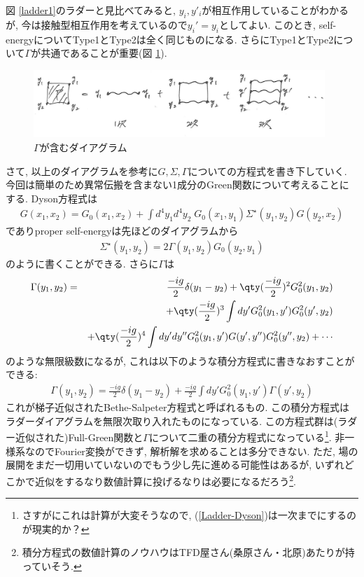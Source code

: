 \documentclass[10.5pt,a4paper]{jreport}
\begin{document}
図 \ref{ladder1}のラダーと見比べてみると, $y_i, y'_i$が相互作用していることがわかるが, 今は接触型相互作用を考えているので$y_i' = y_i$としてよい. このとき, self-energyについてType1とType2は全く同じものになる.  さらにType1とType2について$\Gamma$が共通であることが重要(図 \ref{ladder3}).
\begin{figure}[htbp]
  \begin{center}
    \includegraphics[width = 11cm]{./EPS/ladder3.eps}
  \end{center}
  \caption{$\Gamma$が含むダイアグラム}\label{ladder3}
\end{figure}
さて, 以上のダイアグラムを参考に$G, \Sigma, \Gamma$についての方程式を書き下していく. 今回は簡単のため異常伝搬を含まない1成分のGreen関数について考えることにする. Dyson方程式は
\begin{eqnarray}
  G(x_1, x_2) = G_0(x_1, x_2) + \int d^4y_1d^4y_2\;G_0(x_1, y_1)\Sigma^\star(y_1, y_2)G(y_2, x_2)\label{Ladder-Dyson}
\end{eqnarray}
でありproper self-energyは先ほどのダイアグラムから
\begin{eqnarray}
  \Sigma^\star(y_1, y_2) = 2\Gamma(y_1, y_2)G_0(y_2, y_1)
\end{eqnarray}
のように書くことができる. さらに$\Gamma$は
\begin{eqnarray}
  \nonumber  \Gamma(y_1, y_2) &=& \frac{-ig}{2}\delta(y_1 - y_2) + \qty(\frac{-ig}{2})^2G_0^2(y_1, y_2)\\
  \nonumber  &&+ \qty(\frac{-ig}{2})^3\int dy' G_0^2(y_1, y')G_0^2(y', y_2)\\
  &&+ \qty(\frac{-ig}{2})^4\int dy'dy'' G_0^2(y_1, y')G(y', y'')G_0^2(y'', y_2) + \cdots
\end{eqnarray}
のような無限級数になるが, これは以下のような積分方程式に書きなおすことができる:
\begin{eqnarray}
  \Gamma(y_1, y_2) = \frac{-ig}{2}\delta(y_1 - y_2) + \frac{-ig}{2}\int dy'G_0^2(y_1, y')\Gamma(y', y_2)\label{Bethe-Salpeter}
\end{eqnarray}
これが梯子近似されたBethe-Salpeter方程式と呼ばれるもの. この積分方程式はラダーダイアグラムを無限次取り入れたものになっている. この方程式群は(ラダー近似された)Full-Green関数と$\Gamma$について二重の積分方程式になっている\footnote{さすがにこれは計算が大変そうなので, (\ref{Ladder-Dyson})は一次までにするのが現実的か？}. 非一様系なのでFourier変換ができず, 解析解を求めることは多分できない. ただ, 場の展開をまだ一切用いていないのでもう少し先に進める可能性はあるが, いずれどこかで近似をするなり数値計算に投げるなりは必要になるだろう\footnote{積分方程式の数値計算のノウハウはTFD屋さん(桑原さん・北原)あたりが持っていそう. }. 
\end{document}
